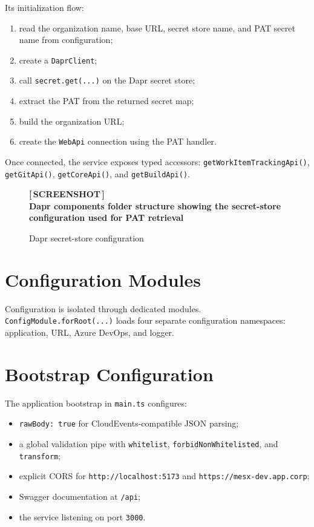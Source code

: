 \documentclass[12pt,a4paper]{report}
\newcommand{\screenshot}[2][Screenshot placeholder]{%
  \begin{figure}[H]
    \centering
    \begin{tcolorbox}[
      enhanced,
      colback=screenshotbg,
      colframe=screenshotborder,
      boxrule=1pt,
      arc=4pt,
      left=4pt, right=4pt, top=4pt, bottom=4pt,
      width=\textwidth,
      height=7cm,
      valign=center,
    ]
      \centering
      \color{primary}
      \large\bfseries [\,SCREENSHOT\,]\\[6pt]
      \normalsize\normalfont\color{darkgray}#1
    \end{tcolorbox}
    \caption{#2}
  \end{figure}%
}
\newcommand{\code}[1]{\texttt{\small\color{codered}#1}}
\begin{document}
\medskip
Its initialization flow:

\begin{enumerate}
  \item read the organization name, base URL, secret store name, and PAT secret name from configuration;
  \item create a \code{DaprClient};
  \item call \code{secret.get(...)} on the Dapr secret store;
  \item extract the PAT from the returned secret map;
  \item build the organization URL;
  \item create the \code{WebApi} connection using the PAT handler.
\end{enumerate}

\noindent Once connected, the service exposes typed accessors:
\code{getWorkItemTrackingApi()}, \code{getGitApi()}, \code{getCoreApi()}, and
\code{getBuildApi()}.

\screenshot[Dapr components folder structure showing the secret-store configuration used for PAT retrieval]{Dapr secret-store configuration}

\section{Configuration Modules}

Configuration is isolated through dedicated modules. \code{ConfigModule.forRoot(...)}
loads four separate configuration namespaces: application, URL, Azure DevOps, and
logger.

\section{Bootstrap Configuration}

The application bootstrap in \code{main.ts} configures:

\begin{itemize}
  \item \code{rawBody: true} for CloudEvents-compatible JSON parsing;
  \item a global validation pipe with \code{whitelist}, \code{forbidNonWhitelisted}, and \code{transform};
  \item explicit CORS for \code{http://localhost:5173} and \code{https://mesx-dev.app.corp};
  \item Swagger documentation at \code{/api};
  \item the service listening on port \texttt{3000}.
\end{itemize}
\end{document}
